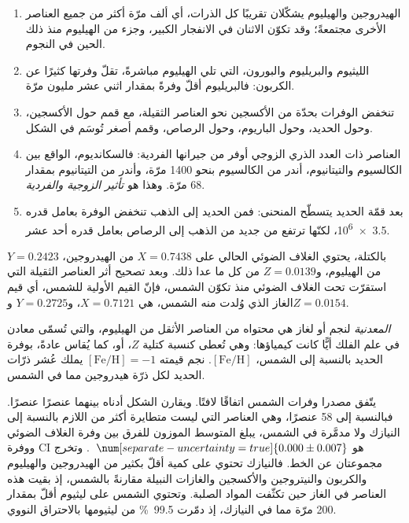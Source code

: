 \begin{enumerate}
\item الهيدروجين والهيليوم يشكّلان تقريبًا كل الذرات، أي ألف مرّة أكثر من جميع العناصر الأخرى مجتمعةً؛
  وقد تكوّن الاثنان في الانفجار الكبير،
  وجزء من الهيليوم منذ ذلك الحين في النجوم.
\item الليثيوم والبريليوم والبورون، التي تلي الهيليوم مباشرةً، تقلّ وفرتها كثيرًا عن الكربون:
  فالبريليوم أقلّ وفرةً بمقدار اثني عشر مليون مرّة.
\item تنخفض الوفرات بحدّة من الأكسجين نحو العناصر الثقيلة، مع قمم حول الأكسجين،
  وحول الحديد، وحول الباريوم، وحول الرصاص،
  وقمم أصغر تُوسَم في الشكل.
\item العناصر ذات العدد الذري الزوجي أوفر من جيرانها الفردية: فالسكانديوم،
  الواقع بين الكالسيوم والتيتانيوم، أندر من الكالسيوم بنحو \num{1400} مرّة،
  وأندر من التيتانيوم بمقدار \num{68} مرّة. وهذا هو
  \emph{تأثير الزوجية والفردية}.
\item بعد قمّة الحديد يتسطّح المنحنى: فمن الحديد إلى الذهب تنخفض الوفرة
  بعامل قدره \num{3.5e6}، لكنّها ترتفع من جديد من الذهب إلى الرصاص
  بعامل قدره أحد عشر.
\end{enumerate}

بالكتلة، يحتوي الغلاف الضوئي الحالي على $X = 0.7438$ من الهيدروجين،
$Y = 0.2423$ من الهيليوم، و$Z = 0.0139$ من كل ما عدا ذلك. وبعد تصحيح أثر العناصر الثقيلة
التي استقرّت تحت الغلاف الضوئي منذ تكوّن الشمس،
فإنّ القيم الأولية للشمس، أي قيم الغاز الذي وُلدت منه الشمس، هي $X = 0.7121$،
و$Y = 0.2725$ و$Z = 0.0154$.

\begin{definition}[المعدنية]\label{def:b3:origin-of-elements:metallicity}
\emph{المعدنية} لنجم أو لغاز هي محتواه من
العناصر الأثقل من الهيليوم، والتي تُسمّى معادن في علم الفلك أيًّا كانت كيمياؤها:
وهي تُعطى كنسبة كتلية $Z$، أو، كما يُقاس عادةً،
بوفرة الحديد بالنسبة إلى الشمس، $[\mathrm{Fe/H}]$.
نجم قيمته $[\mathrm{Fe/H}] = -1$ يملك
عُشر ذرّات الحديد لكل ذرّة هيدروجين مما في الشمس.
\end{definition}

يتّفق مصدرا وفرات الشمس اتفاقًا لافتًا.
ويقارن الشكل أدناه بينهما عنصرًا عنصرًا. فبالنسبة إلى 58 عنصرًا،
وهي العناصر التي ليست متطايرة أكثر من اللازم بالنسبة إلى النيازك ولا مدمَّرة في الشمس،
يبلغ المتوسط الموزون للفرق بين وفرة الغلاف الضوئي ووفرة CI
هو $\num[separate-uncertainty=true]{0.000 \pm 0.007}$~. وتخرج مجموعتان عن الخط.
فالنيازك تحتوي على كمية أقلّ بكثير من الهيدروجين والهيليوم
والكربون والنيتروجين والأكسجين والغازات النبيلة مقارنةً بالشمس،
إذ بقيت هذه العناصر في الغاز حين تكثّفت المواد الصلبة. وتحتوي الشمس
على ليثيوم أقلّ بمقدار \num{200} مرّة مما في النيازك، إذ دمّرت
\qty{99.5}{\percent} من ليثيومها بالاحتراق النووي.

